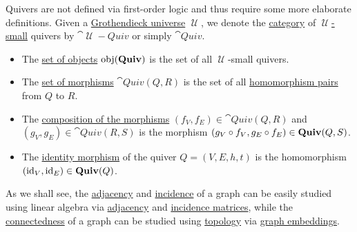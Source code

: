 \begin{definition}
\begin{thmenum}
    Quivers are not defined via first-order logic and thus require some more elaborate definitions. Given a \hyperref[def:grothendieck_universe]{Grothendieck universe} \( \mscrU \), we denote the \hyperref[def:category]{category} of \hyperref[def:large_and_small_sets]{\( \mscrU \)-small} quivers by \( \cat{\mscrU-Quiv} \) or simply \( \cat{Quiv} \).
    \begin{itemize}
      \item The \hyperref[def:category/objects]{set of objects} \( \operatorname{obj}(\operatorname{\mathbf{Quiv}}) \) is the set of all \( \mscrU \)-small quivers.
      \item The \hyperref[def:category/morphisms]{set of morphisms} \( \cat{Quiv}(Q, R) \) is the set of all \hyperref[def:theory_of_graphs/quiver_homomorphism]{homomorphism pairs} from \( Q \) to \( R \).

      \item The \hyperref[def:category/composition]{composition of the morphisms} \( (f_V, f_E) \in \cat{Quiv}(Q, R) \) and \( (g_V, g_E) \in \cat{Quiv}(R, S) \) is the morphism \( (g_V \mathbin \circ f_V, g_E \mathbin \circ f_E) \in \operatorname{\mathbf{Quiv}}(Q, S) \).

      \item The \hyperref[def:category/identity]{identity morphism} of the quiver \( Q = (V, E, h, t) \) is the homomorphism \( (\operatorname{id}_V, \operatorname{id}_E) \in \operatorname{\mathbf{Quiv}}(Q) \).
    \end{itemize}
  \end{thmenum}
\end{definition}

\begin{remark}\label{rem:graphs_linear_algebra_and_topology}
  As we shall see, the \hyperref[def:graph/adjacent_vertices]{adjacency} and \hyperref[def:graph/incidence]{incidence} of a graph can be easily studied using linear algebra via \hyperref[def:graph_adjacency_matrix]{adjacency} and \hyperref[def:multigraph_incidence_matrix]{incidence matrices}, while the \hyperref[def:quiver_connectedness]{connectedness} of a graph can be studied using \hyperref[def:quiver_connectedness]{topology} via \hyperref[def:quiver_geometric_relization/embedding]{graph embeddings}.
\end{remark}

